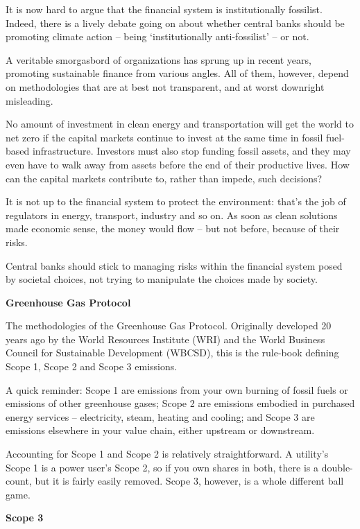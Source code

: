 \documentclass[
]{book}
\begin{document}
It is now hard to argue that the financial system is institutionally fossilist. Indeed, there is a lively debate going on about whether central banks should be promoting climate action -- being `institutionally anti-fossilist' -- or not.

A veritable smorgasbord of organizations has sprung up in recent years, promoting sustainable finance from various angles. All of them, however, depend on methodologies that are at best not transparent, and at worst downright misleading.

No amount of investment in clean energy and transportation will get the world to net zero if the capital markets continue to invest at the same time in fossil fuel-based infrastructure. Investors must also stop funding fossil assets, and they may even have to walk away from assets before the end of their productive lives. How can the capital markets contribute to, rather than impede, such decisions?

It is not up to the financial system to protect the environment:
that's the job of regulators in energy, transport, industry and so on.
As soon as clean solutions made economic sense, the money would flow --
but not before, because of their risks.

Central banks should stick to managing risks within the financial system posed by societal choices, not trying to manipulate the choices made by society.

\textbf{Greenhouse Gas Protocol}

The methodologies of the Greenhouse Gas Protocol. Originally developed 20 years ago by the World Resources Institute (WRI) and the World Business Council for Sustainable Development (WBCSD), this is the rule-book defining Scope 1, Scope 2 and Scope 3 emissions.

A quick reminder: Scope 1 are emissions from your own burning of fossil fuels or emissions of other greenhouse gases; Scope 2 are emissions embodied in purchased energy services -- electricity, steam, heating and cooling; and Scope 3 are emissions elsewhere in your value chain, either upstream or downstream.

Accounting for Scope 1 and Scope 2 is relatively straightforward. A utility's Scope 1 is a power user's Scope 2, so if you own shares in both, there is a double-count, but it is fairly easily removed. Scope 3, however, is a whole different ball game.

\textbf{Scope 3}
\end{document}
